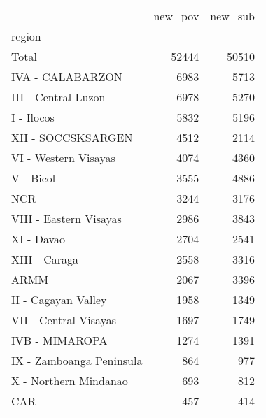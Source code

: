 \begin{tabular}{lrr}
\toprule
{} &  new\_pov &  new\_sub \\
region                   &          &          \\
\midrule
Total                    &    52444 &    50510 \\
IVA - CALABARZON         &     6983 &     5713 \\
III - Central Luzon      &     6978 &     5270 \\
I - Ilocos               &     5832 &     5196 \\
XII - SOCCSKSARGEN       &     4512 &     2114 \\
VI - Western Visayas     &     4074 &     4360 \\
V - Bicol                &     3555 &     4886 \\
NCR                      &     3244 &     3176 \\
VIII - Eastern Visayas   &     2986 &     3843 \\
XI - Davao               &     2704 &     2541 \\
XIII - Caraga            &     2558 &     3316 \\
ARMM                     &     2067 &     3396 \\
II - Cagayan Valley      &     1958 &     1349 \\
VII - Central Visayas    &     1697 &     1749 \\
IVB - MIMAROPA           &     1274 &     1391 \\
IX - Zamboanga Peninsula &      864 &      977 \\
X - Northern Mindanao    &      693 &      812 \\
CAR                      &      457 &      414 \\
\bottomrule
\end{tabular}
